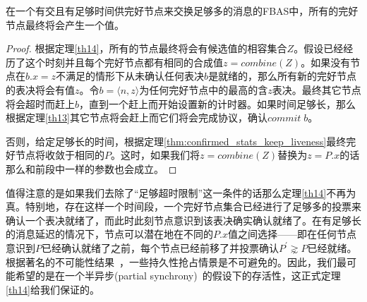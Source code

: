 \begin{theorem}\label{th14}
        在一个有{\quorum}交且有足够时间供完好节点来交换足够多的消息的FBAS中，所有的完好节点最终将会产生一个值。
\end{theorem}

\begin{proof}
        根据定理\ref{th14}，所有的节点最终将会有候选值的相容集合$Z$。假设已经经历了这个时刻并且每个完好节点都有相同的合成值$z=combine(Z)$。如果没有节点在$b.x=z$不满足的情形下从未确认任何表决$b$是就绪的，那么所有新的完好节点的表决将会有值$z$。令$b=\langle n,z\rangle$为任何完好节点中的最高的含$z$表决。最终其它节点将会超时而赶上$b$，直到一个{\quorum}赶上而开始设置新的计时器。如果时间足够长，那么根据定理\ref{th13}其它节点将会赶上而它们将会完成协议，确认$commit\;b$。
        
        否则，给定足够长的时间，根据定理\ref{thm:confirmed_stats_keep_liveness}最终完好节点将收敛于相同的$P$。这时，如果我们将$z=combine(Z)$替换为$z=P.x$的话那么和前段中一样的参数也会成立。
\end{proof}

值得注意的是如果我们去除了``足够超时限制''这一条件的话那么定理\ref{th14}不再为真。特别地，存在这样一个时间段，一个完好节点集合已经进行了足够多的投票来确认一个表决就绪了，而此时此刻节点意识到该表决确实确认就绪了。在有足够长的消息延迟的情况下，节点可以潜在地在不同的$P.x$值之间选择——即在任何节点意识到$P$已经确认就绪了之前，每个节点已经前移了并投票确认$P^{\prime}\gnsim P$已经就绪。根据著名的不可能性结果~\cite{Fischer:1985:IDC:3149.214121}，一些持久性抢占情景是不可避免的。因此，我们最可能希望的是在一个半异步(partial synchrony)~\cite{Dwork:1988:CPP:42282.42283}的假设下的存活性，这正式定理\ref{th14}给我们保证的。